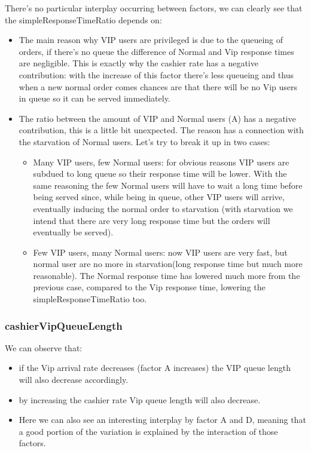 There's no particular interplay occurring between factors, we can clearly see that the simpleResponseTimeRatio depends on:
\begin{itemize}
    \item The main reason why VIP users are privileged is due to the queueing of orders, if there's no queue the difference of Normal and Vip response times are negligible. This is exactly why the cashier rate has a negative contribution: with the increase of this factor there's less queueing and thus when a new normal order comes chances are that there will be no Vip users in queue so it can be served immediately.
  \item The ratio between the amount of VIP and Normal users (A) has a negative contribution, this is a little bit unexpected. The reason has a connection with the starvation of Normal users. Let's try to break it up in two cases: 
  \begin{itemize}
    \item Many VIP users, few Normal users: for obvious reasons VIP users are subdued to long queue so their response time will be lower. With the same reasoning the few Normal users will have to wait a long time before being served since, while being in queue, other VIP users will arrive, eventually inducing the normal order to starvation (with starvation we intend that there are very long response time but the orders will eventually be served).
    \item Few VIP users, many Normal users: now VIP users are very fast, but normal user are no more in starvation(long response time but much more reasonable). The Normal response time has lowered much more from the previous case, compared to the Vip response time, lowering the simpleResponseTimeRatio too.
    \end{itemize}
\end{itemize}


\subsubsection{cashierVipQueueLength}


We can observe that:
\begin{itemize}
    \item if the Vip arrival rate decreases (factor A increases) the VIP queue length will also decrease accordingly.
    \item by increasing the cashier rate Vip queue length will also decrease.
    \item Here we can also see an interesting interplay by factor A and D, meaning that a good portion of the variation is explained by the interaction of those factors.
\end{itemize}

